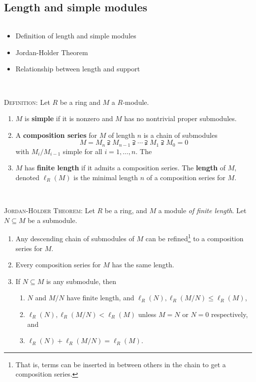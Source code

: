 \documentclass[12pt]{amsart}
\newcommand{\0}{$\phantom{.}$}
\newcommand{\1}{\mathbbm{1}}
\begin{document}
\setcounter{subsection}{33}

\subsection{Length and simple modules} \0

\begin{framed}
\begin{itemize}
\item Definition of length and simple modules
\item Jordan-Holder Theorem
\item Relationship between length and support
\end{itemize}
\end{framed}

\



	\noindent	\textsc{Definition:} Let $R$ be a ring and $M$ a $R$-module.
	\begin{enumerate}
	\item $M$ is \textbf{simple} if it is nonzero and $M$ has no nontrivial proper submodules.
	\item A \textbf{composition series} for $M$ of length $n$ is a chain of submodules
	\[ M = M_n \supsetneqq M_{n-1} \supsetneqq \cdots \supsetneqq M_1 \supsetneqq M_0 = 0\]
	with $M_{i}/M_{i-1}$ simple for all $i=1,\dots,n$. The
	\item $M$ has \textbf{finite length} if it admits a composition series. The \textbf{length} of $M$, denoted $\ell_R(M)$ is the minimal length $n$ of a composition series for $M$.
	\end{enumerate}
	
		\
	
	\noindent \textsc{Jordan-H\"older Theorem:} Let $R$ be a ring, and $M$ a module \emph{of finite length}.
Let $N\subseteq M$ be a submodule.
	\begin{enumerate}
	\item Any descending chain of submodules of $M$ can be refined\footnote{That is, terms can be inserted in between others in the chain to get a composition series.} to a composition series for $M$.
	\item Every composition series for $M$ has the same length.
	\item If $N\subseteq M$ is any submodule, then 
	\begin{enumerate}
	\item $N$ and $M/N$ have finite length, and $\ell_R(N), \ell_R(M/N) \leq \ell_R(M)$,
	\item $\ell_R(N), \ell_R(M/N) <\ell_R(M)$ unless $M=N$ or $N=0$ respectively, and
	\item $\ell_R(N)+\ell_R(M/N)=\ell_R(M)$.
	\end{enumerate}
	\end{enumerate}
	
\end{document}
